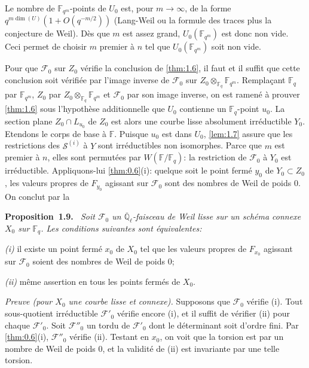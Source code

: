 \documentclass[11pt,a4paper]{article}
\makeatletter
\theoremstyle{plain}
\theoremstyle{definition}
\newenvironment{manualblock}[4]{%
  \par\medskip\noindent\textbf{#1~#2#3.}\def\@currentlabel{#2}\label{#4}\itshape\ }{\par\normalfont\medskip}
\makeatother
\begin{document}
Le nombre de $\mathbb{F}_{q^m}$-points de $U_0$ est, pour $m \to \infty$, de la forme $q^{m\dim(U)}(1+O(q^{-m/2}))$ (Lang-Weil ou la formule des traces plus la conjecture de Weil). D\`es que $m$ est assez grand, $U_0(\mathbb{F}_{q^m})$ est donc non vide. Ceci permet de choisir $m$ premier \`a $n$ tel que $U_0(\mathbb{F}_{q^m})$ soit non vide.

Pour que $\mathcal{F}_0$ sur $Z_0$ v\'erifie la conclusion de \ref{thm:1.6}, il faut et il suffit que cette conclusion soit v\'erifi\'ee par l'image inverse de $\mathcal{F}_0$ sur $Z_0 \otimes_{\mathbb{F}_q} \mathbb{F}_{q^m}$. Rempla\c{c}ant $\mathbb{F}_q$ par $\mathbb{F}_{q^m}$, $Z_0$ par $Z_0 \otimes_{\mathbb{F}_q} \mathbb{F}_{q^m}$ et $\mathcal{F}_0$ par son image inverse, on est ramen\'e \`a prouver \ref{thm:1.6} sous l'hypoth\`ese additionnelle que $U_0$ contienne un $\mathbb{F}_q$-point $u_0$. La section plane $Z_0 \cap L_{u_0}$ de $Z_0$ est alors une courbe lisse absolument irr\'eductible $Y_0$. Etendons le corps de base \`a $\mathbb{F}$. Puisque $u_0$ est dans $U_0$, \ref{lem:1.7} assure que les restrictions des $\mathcal{S}^{(i)}$ \`a $Y$ sont irr\'eductibles non isomorphes. Parce que $m$ est premier \`a $n$, elles sont permut\'ees par $W(\mathbb{F}/\mathbb{F}_q)$: la restriction de $\mathcal{F}_0$ \`a $Y_0$ est irr\'eductible. Appliquons-lui \ref{thm:0.6}(i): quelque soit le point ferm\'e $y_0$ de $Y_0 \subset Z_0$, les valeurs propres de $F_{y_0}$ agissant sur $\mathcal{F}_0$ sont des nombres de Weil de poids $0$. On conclut par la

\begin{manualblock}{Proposition}{1.9}{}{prop:1.9}
Soit $\mathcal{F}_0$ un $\overline{\mathbb{Q}}_\ell$-faisceau de Weil lisse sur un sch\'ema connexe $X_0$ sur $\mathbb{F}_q$. Les conditions suivantes sont \'equivalentes:

\emph{(i)} il existe un point ferm\'e $x_0$ de $X_0$ tel que les valeurs propres de $F_{x_0}$ agissant sur $\mathcal{F}_0$ soient des nombres de Weil de poids $0$;

\emph{(ii)} m\^eme assertion en tous les points ferm\'es de $X_0$.
\end{manualblock}

\noindent\textit{Preuve (pour $X_0$ une courbe lisse et connexe).} Supposons que $\mathcal{F}_0$ v\'erifie (i). Tout sous-quotient irr\'eductible $\mathcal{F}'_0$ v\'erifie encore (i), et il suffit de v\'erifier (ii) pour chaque $\mathcal{F}'_0$. Soit $\mathcal{F}''_0$ un tordu de $\mathcal{F}'_0$ dont le d\'eterminant soit d'ordre fini. Par \ref{thm:0.6}(i), $\mathcal{F}''_0$ v\'erifie (ii). Testant en $x_0$, on voit que la torsion est par un nombre de Weil de poids $0$, et la validit\'e de (ii) est invariante par une telle torsion.
\end{document}
